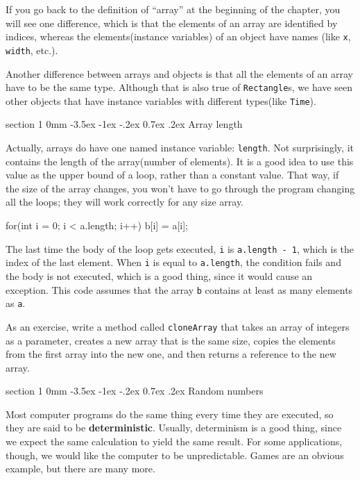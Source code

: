 \documentclass{book}
\makeatletter
\renewcommand{\section}{\@startsection 
    {section} {1} {0mm}%
    {-3.5ex \@plus -1ex \@minus -.2ex}%
    {0.7ex \@plus.2ex}%
    {\normalfont\Large\bfseries}}
\makeatother
\begin{document}
If you go back to the definition of ``array'' at the beginning
of the chapter, you will see one difference, which is that the
elements of an array are identified by indices, whereas the
elements(instance variables) of an object have names
(like {\tt x}, {\tt width}, etc.).

Another difference between arrays and objects is that all the
elements of an array have to be the same type.  Although that
is also true of {\tt Rectangle}s, we have seen other objects
that have instance variables with different types(like
{\tt Time}).

\section{Array length}

Actually, arrays do have one named instance variable: {\tt length}.
Not surprisingly, it contains the length of the array(number
of elements).  It is a good idea to use this value as the upper
bound of a loop, rather than a constant value.  That way, if
the size of the array changes, you won't have to go through the
program changing all the loops; they will work correctly for any
size array.

\begin{verbatimtab}
    for(int i = 0; i < a.length; i++) {
      b[i] = a[i];
    }
\end{verbatimtab}
%
The last time the body of the loop gets executed, {\tt i}
is {\tt a.length - 1}, which is the index of the last element.  When
{\tt i} is equal to {\tt a.length}, the condition fails and the body
is not executed, which is a good thing, since it would cause an
exception.  This code assumes that the array {\tt b} contains at least
as many elements as {\tt a}.

As an exercise, write a method called {\tt cloneArray} that takes an
array of integers as a parameter, creates a new array that is the same
size, copies the elements from the first array into the new one, and
then returns a reference to the new array.

\section{Random numbers}
\label{random}
\label{pseudorandom}

Most computer programs do the same thing every time they are executed,
so they are said to be {\bf deterministic}.  Usually, determinism is a
good thing, since we expect the same calculation to yield the same
result.  For some applications, though, we would like the
computer to be unpredictable.  Games are an obvious example, but
there are many more.
\end{document}
